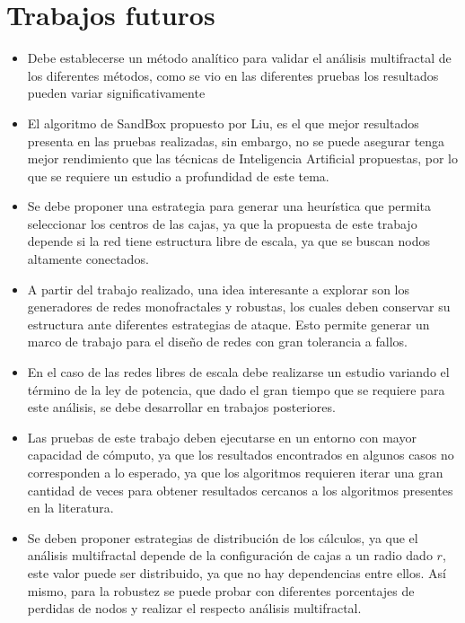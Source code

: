 \newpage
\section{Trabajos futuros}

\begin{itemize}
    \item Debe establecerse un método analítico para validar el análisis multifractal de los diferentes métodos, como se vio en las diferentes pruebas los resultados pueden variar significativamente
    \item El algoritmo de SandBox propuesto por Liu\cite{Liu2015}, es el que mejor resultados presenta en las pruebas realizadas, sin embargo, no se puede asegurar tenga mejor rendimiento que las técnicas de Inteligencia Artificial propuestas, por lo que se requiere un estudio a profundidad de este tema.
    \item Se debe proponer una estrategia para generar una heurística que permita seleccionar los centros de las cajas, ya que la propuesta de este trabajo depende si la red tiene estructura libre de escala, ya que se buscan nodos altamente conectados.
    \item A partir del trabajo realizado, una idea interesante a explorar son los generadores de redes monofractales y robustas, los cuales deben conservar su estructura ante diferentes estrategias de ataque. Esto permite generar un marco de trabajo para el diseño de redes con gran tolerancia a fallos.
    \item En el caso de las redes libres de escala debe realizarse un estudio variando el término de la ley de potencia, que dado el gran tiempo que se requiere para este análisis, se debe desarrollar en trabajos posteriores.
    \item Las pruebas de este trabajo deben ejecutarse en un entorno con mayor capacidad de cómputo, ya que los resultados encontrados en algunos casos no corresponden a lo esperado, ya que los algoritmos requieren iterar una gran cantidad de veces para obtener resultados cercanos a los algoritmos presentes en la literatura.
    \item Se deben proponer estrategias de distribución de los cálculos, ya que el análisis multifractal depende de la configuración de cajas a un radio dado $r$, este valor puede ser distribuido, ya que no hay dependencias entre ellos. Así mismo, para la robustez se puede probar con diferentes porcentajes de perdidas de nodos y realizar el respecto análisis multifractal.
\end{itemize}
